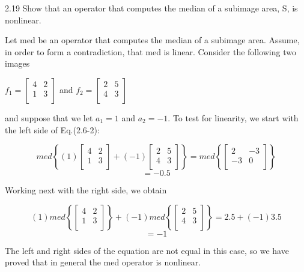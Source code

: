 \documentclass[11pt]{article}  %
\begin{document}
2.19 Show that an operator that computes the median of a subimage
area, S, is nonlinear.

Let med be an operator that computes the median of a subimage area. Assume, 
in order to form a contradiction, that med is linear. Consider the 
following two images

$
f_1 =
\left[ {\begin{array}{cc}
 4 & 2  \\
 1 & 3  \\
 \end{array} } \right]
$ and $
f_2 =
\left[ {\begin{array}{cc}
 2 & 5  \\
 4 & 3  \\
 \end{array} } \right]
$

and suppose that we let $a_1 = 1$ and $a_2 = -1$. To test for linearity,
we start with the left side of Eq.(2.6-2):

\[
med
\left\{ {
(1)
\left[ {\begin{array}{cc}
 4 & 2  \\
 1 & 3  \\
 \end{array} } \right]
+
(-1)
\left[ {\begin{array}{cc}
 2 & 5  \\
 4 & 3  \\
 \end{array} } \right] }
\right\}
=
med
\left\{ {
\left[ {\begin{array}{cc}
 2 & -3  \\
 -3 & 0  \\
 \end{array} } \right] }
\right\}
\]
\[= -0.5\]

Working next with the right side, we obtain

\[
(1)
med
\left\{ {
    \left[ {\begin{array}{cc}
     4 & 2  \\
     1 & 3  \\
     \end{array} } \right]
} \right\}
+
(-1)
med
\left\{ {
    \left[ {\begin{array}{cc}
     2 & 5  \\
     4 & 3  \\
     \end{array} } \right]
} \right\}
= 2.5 + (-1)3.5
\]
\[= -1\]

The left and right sides of the equation are not equal in this case, so
we have proved that in general the med operator is nonlinear.
\end{document}
